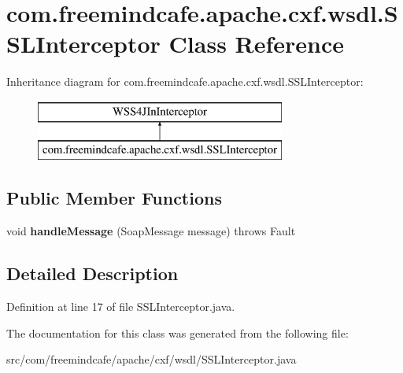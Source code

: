 \hypertarget{classcom_1_1freemindcafe_1_1apache_1_1cxf_1_1wsdl_1_1_s_s_l_interceptor}{}\section{com.\+freemindcafe.\+apache.\+cxf.\+wsdl.\+S\+S\+L\+Interceptor Class Reference}
\label{classcom_1_1freemindcafe_1_1apache_1_1cxf_1_1wsdl_1_1_s_s_l_interceptor}
Inheritance diagram for com.\+freemindcafe.\+apache.\+cxf.\+wsdl.\+S\+S\+L\+Interceptor\+:\begin{figure}[H]
\begin{center}
\leavevmode
\includegraphics[height=2.000000cm]{classcom_1_1freemindcafe_1_1apache_1_1cxf_1_1wsdl_1_1_s_s_l_interceptor}
\end{center}
\end{figure}
\subsection*{Public Member Functions}
\begin{DoxyCompactItemize}
\item 
\hypertarget{classcom_1_1freemindcafe_1_1apache_1_1cxf_1_1wsdl_1_1_s_s_l_interceptor_aa5a8b4539371b99034a1886b6d1388de}{}void {\bfseries handle\+Message} (Soap\+Message message)  throws Fault \label{classcom_1_1freemindcafe_1_1apache_1_1cxf_1_1wsdl_1_1_s_s_l_interceptor_aa5a8b4539371b99034a1886b6d1388de}

\end{DoxyCompactItemize}


\subsection{Detailed Description}


Definition at line 17 of file S\+S\+L\+Interceptor.\+java.



The documentation for this class was generated from the following file\+:\begin{DoxyCompactItemize}
\item 
src/com/freemindcafe/apache/cxf/wsdl/S\+S\+L\+Interceptor.\+java\end{DoxyCompactItemize}
